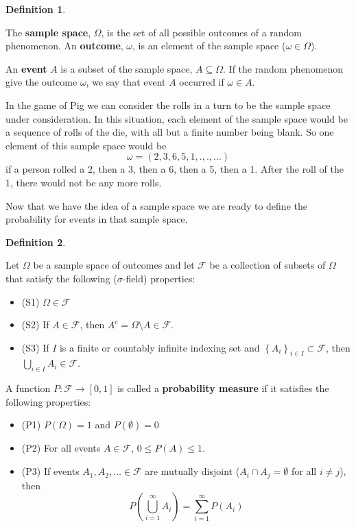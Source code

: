 \documentclass[
]{book}
\providecommand{\tightlist}{%
  \setlength{\itemsep}{0pt}\setlength{\parskip}{0pt}}
\theoremstyle{definition}
\newtheorem{definition}{Definition}[chapter]
\theoremstyle{definition}
\theoremstyle{definition}
\theoremstyle{definition}
\theoremstyle{remark}
\begin{document}
\begin{definition}
\protect\hypertarget{def:unlabeled-div-305}{}\label{def:unlabeled-div-305}

The \textbf{sample space}, \(\Omega\), is the set of all possible outcomes of a random phenomenon. An \textbf{outcome}, \(\omega\), is an element of the sample space (\(\omega \in \Omega\)).

An \textbf{event} \(A\) is a subset of the sample space, \(A \subseteq \Omega\). If the random phenomenon give the outcome \(\omega\), we say that event \(A\) occurred if \(\omega \in A\).

\end{definition}

In the game of Pig we can consider the rolls in a turn to be the sample space under consideration. In this situation, each element of the sample space would be a sequence of rolls of the die, with all but a finite number being blank. So one element of this sample space would be
\[\omega = (2,3,6,5,1,.,.,\ldots)\] if a person rolled a 2, then a 3, then a 6, then a 5, then a 1. After the roll of the 1, there would not be any more rolls.

Now that we have the idea of a sample space we are ready to define the probability for events in that sample space.

\begin{definition}
\protect\hypertarget{def:unlabeled-div-306}{}\label{def:unlabeled-div-306}

Let \(\Omega\) be a sample space of outcomes and let \(\mathcal{F}\) be a collection of subsets of \(\Omega\) that satisfy the following (\(\sigma\)-field) properties:

\begin{itemize}
\tightlist
\item
  (S1) \(\Omega \in \mathcal{F}\)
\item
  (S2) If \(A\in \mathcal{F}\), then \(A^c = \Omega\setminus A \in \mathcal{F}\).
\item
  (S3) If \(I\) is a finite or countably infinite indexing set and \(\left\{A_i \right\}_{i\in I} \subset \mathcal{F}\), then \(\bigcup_{i\in I} A_i \in \mathcal{F}\).
\end{itemize}

A function \(P:\mathcal{F} \rightarrow [0,1]\) is called a \textbf{probability measure} if it satisfies the following properties:

\begin{itemize}
\tightlist
\item
  (P1) \(P(\Omega) = 1\) and \(P(\emptyset)=0\)
\item
  (P2) For all events \(A \in \mathcal{F}\), \(0\leq P(A) \leq 1\).
\item
  (P3) If events \(A_1, A_2, \ldots \in \mathcal{F}\) are mutually disjoint (\(A_i \cap A_j = \emptyset\) for all \(i\neq j\)), then
  \[P\left(\bigcup_{i=1}^\infty A_i \right) = \sum_{i=1}^\infty P(A_i)\]
\end{itemize}

\end{definition}
\end{document}
